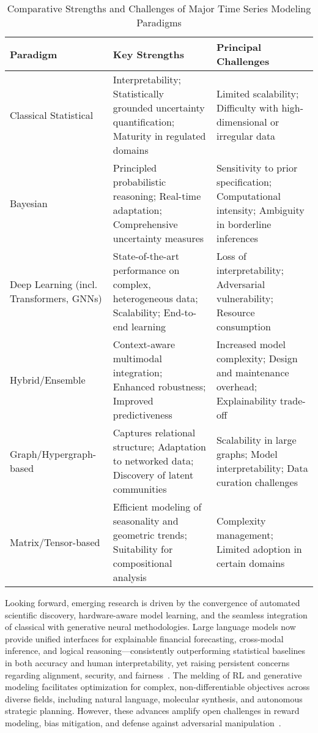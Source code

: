 \documentclass[11pt]{article}
\begin{document}
\begin{table}[ht]
\centering
\caption{Comparative Strengths and Challenges of Major Time Series Modeling Paradigms}
\label{tab:paradigm_features}
\begin{tabular}{|p{3cm}|p{5cm}|p{5cm}|}
\hline
\textbf{Paradigm} & \textbf{Key Strengths} & \textbf{Principal Challenges} \\
\hline
Classical Statistical & Interpretability; Statistically grounded uncertainty quantification; Maturity in regulated domains & Limited scalability; Difficulty with high-dimensional or irregular data \\
\hline
Bayesian & Principled probabilistic reasoning; Real-time adaptation; Comprehensive uncertainty measures & Sensitivity to prior specification; Computational intensity; Ambiguity in borderline inferences \\
\hline
Deep Learning (incl. Transformers, GNNs) & State-of-the-art performance on complex, heterogeneous data; Scalability; End-to-end learning & Loss of interpretability; Adversarial vulnerability; Resource consumption \\
\hline
Hybrid/Ensemble & Context-aware multimodal integration; Enhanced robustness; Improved predictiveness & Increased model complexity; Design and maintenance overhead; Explainability trade-off \\
\hline
Graph/Hypergraph-based & Captures relational structure; Adaptation to networked data; Discovery of latent communities & Scalability in large graphs; Model interpretability; Data curation challenges \\
\hline
Matrix/Tensor-based & Efficient modeling of seasonality and geometric trends; Suitability for compositional analysis & Complexity management; Limited adoption in certain domains \\
\hline
\end{tabular}
\end{table}

Looking forward, emerging research is driven by the convergence of automated scientific discovery, hardware-aware model learning, and the seamless integration of classical with generative neural methodologies. Large language models now provide unified interfaces for explainable financial forecasting, cross-modal inference, and logical reasoning—consistently outperforming statistical baselines in both accuracy and human interpretability, yet raising persistent concerns regarding alignment, security, and fairness~\cite{ref11,ref20,ref30}. The melding of RL and generative modeling facilitates optimization for complex, non-differentiable objectives across diverse fields, including natural language, molecular synthesis, and autonomous strategic planning. However, these advances amplify open challenges in reward modeling, bias mitigation, and defense against adversarial manipulation~\cite{ref11,ref31,ref79}.
\end{document}
